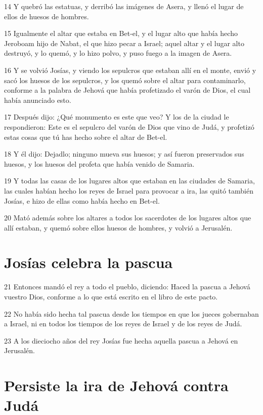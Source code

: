 \par 14 Y quebró las estatuas, y derribó las imágenes de Asera, y llenó el lugar de ellos de huesos de hombres.
\par 15 Igualmente el altar que estaba en Bet-el, y el lugar alto que había hecho Jeroboam hijo de Nabat, el que hizo pecar a Israel; aquel altar y el lugar alto destruyó, y lo quemó, y lo hizo polvo, y puso fuego a la imagen de Asera.
\par 16 Y se volvió Josías, y viendo los sepulcros que estaban allí en el monte, envió y sacó los huesos de los sepulcros, y los quemó sobre el altar para contaminarlo, conforme a la palabra de Jehová que había profetizado el varón de Dios, el cual había anunciado esto. 
\par 17 Después dijo: ¿Qué monumento es este que veo? Y los de la ciudad le respondieron: Este es el sepulcro del varón de Dios que vino de Judá, y profetizó estas cosas que tú has hecho sobre el altar de Bet-el. 
\par 18 Y él dijo: Dejadlo; ninguno mueva sus huesos; y así fueron preservados sus huesos, y los huesos del profeta que había venido de Samaria.
\par 19 Y todas las casas de los lugares altos que estaban en las ciudades de Samaria, las cuales habían hecho los reyes de Israel para provocar a ira, las quitó también Josías, e hizo de ellas como había hecho en Bet-el.
\par 20 Mató además sobre los altares a todos los sacerdotes de los lugares altos que allí estaban, y quemó sobre ellos huesos de hombres, y volvió a Jerusalén.

\section*{Josías celebra la pascua}

\par 21 Entonces mandó el rey a todo el pueblo, diciendo: Haced la pascua a Jehová vuestro Dios, conforme a lo que está escrito en el libro de este pacto.
\par 22 No había sido hecha tal pascua desde los tiempos en que los jueces gobernaban a Israel, ni en todos los tiempos de los reyes de Israel y de los reyes de Judá.
\par 23 A los dieciocho años del rey Josías fue hecha aquella pascua a Jehová en Jerusalén.

\section*{Persiste la ira de Jehová contra Judá}

